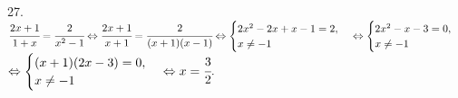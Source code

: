 27. $\cfrac{2x+1}{1+x}=\cfrac{2}{x^2-1}\Leftrightarrow\cfrac{2x+1}{x+1}=\cfrac{2}{(x+1)(x-1)}\Leftrightarrow \begin{cases} 2x^2-2x+x-1=2,\\ x\neq-1\end{cases}
\Leftrightarrow \begin{cases} 2x^2-x-3=0,\\ x\neq-1\end{cases}$\\$\Leftrightarrow \begin{cases} (x+1)(2x-3)=0,\\ x\neq-1\end{cases}\Leftrightarrow x=\cfrac{3}{2}.$\\

